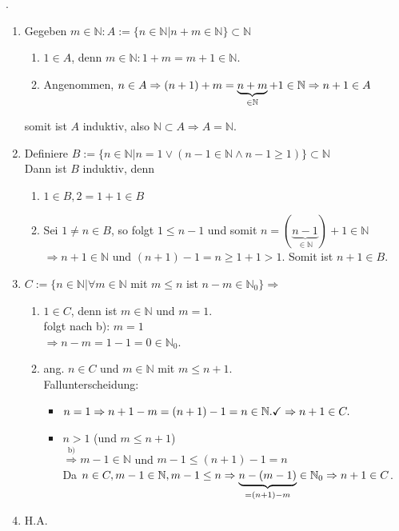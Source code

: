 \documentclass[../ana1.tex]{subfiles}
\begin{document}
\begin{bew}.%
	\begin{enumerate}
		\item Gegeben $m\in\mathbb{N}: A :=\{n\in \mathbb{N}| n+m\in \mathbb{N}\}\subset \mathbb{N}$\\
		      \begin{enumerate}
			      \item $1\in A$, denn $m\in\mathbb{N}: 1+m = m+1\in\mathbb{N}$.
			      \item Angenommen, $n\in A \Rightarrow (n+1) + m = \underbrace{n+m}_{\in\mathbb{N}} + 1 \in\mathbb{N}\\
				            \Rightarrow n+1\in A$
		      \end{enumerate} somit ist $A$ induktiv, also $\mathbb{N}\subset A \Rightarrow A = \mathbb{N}$.
		\item Definiere $B:= \{n\in \mathbb{N}|n=1 \vee (n-1\in\mathbb{N}\wedge n-1\geq 1)\} \subset \mathbb{N}$\\
		      Dann ist $B$ induktiv, denn
		      \begin{enumerate}
			      \item $1\in B, 2=1+1\in B$
			      \item Sei $1\neq n\in B$, so folgt $1\leq n-1$ und somit $n=(\underbrace{n-1}_{\in\mathbb{N}}) +1\in\mathbb{N}$\\
			            $\Rightarrow n+1\in\mathbb{N}$ und $(n+1)-1=n\geq 1+1>1$.
			            Somit ist $n+1\in B$.
		      \end{enumerate}
		\item $C:= \{n\in \mathbb{N} | \forall m \in \mathbb{N}$ mit $m\leq n$ ist $n-m\in \mathbb{N}_0\}\Rightarrow$
		      \begin{enumerate}
			      \item $1\in C$, denn ist $m\in \mathbb{N}$ und $m=1$.\\
			            folgt nach b): $m=1$\\
			            $\Rightarrow n - m = 1 - 1 = 0\in \mathbb{N}_0$.
			      \item ang. $n\in C$ und $m\in\mathbb{N}$ mit $m\leq n+1$.\\
			            Fallunterscheidung:
			            \begin{itemize}
				            \item $n=1 \Rightarrow n+1-m=(n+1)-1=n\in\mathbb{N}.\checkmark\\
					                  \Rightarrow n+1\in C.$
				            \item $n > 1$ (und $m \leq n+1$)\\
				                  $\overset{\text{b)}}{\Rightarrow} m-1\in \mathbb{N}$ und $m-1 \leq (n+1)-1 = n$\\
				                  Da $n\in C, m-1\in\mathbb{N}, m-1\leq n \Rightarrow \underbrace{n-(m-1)}_{=(n+1)-m} \in \mathbb{N}_0\\
					                  \Rightarrow n+1\in C$.
			            \end{itemize}
		      \end{enumerate}
		\item H.A.
	\end{enumerate}
\end{bew}
\end{document}
